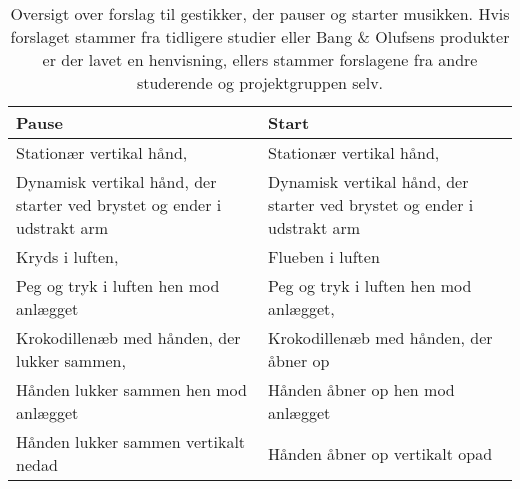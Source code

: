 \begin{table}[H]
	\centering
	\begin{tabular}{| p{6cm} | p{6cm} | }
		\hline
		\textbf{Pause} & \textbf{Start} \\ \hline
		Stationær vertikal hånd, \parencite[s. 166]{PDF:ComparingInputModalities} & Stationær vertikal hånd, \parencite[s. 166]{PDF:ComparingInputModalities} \\ \hline
		Dynamisk vertikal hånd, der starter ved brystet og ender i udstrakt arm  & Dynamisk vertikal hånd, der starter ved brystet og ender i udstrakt arm  \\ \hline
		Kryds i luften, \parencite[s. 48]{PDF:UserDefinedGesturesTV} & Flueben i luften \\ \hline
		Peg og tryk i luften hen mod anlægget & Peg og tryk i luften hen mod anlægget, \parencite[s. 48]{PDF:UserDefinedGesturesTV} \\ \hline
		Krokodillenæb med hånden, der lukker sammen, \parencite[s. 48]{PDF:UserDefinedGesturesTV} & Krokodillenæb med hånden, der åbner op \\ \hline
		Hånden lukker sammen hen mod anlægget & Hånden åbner op hen mod anlægget \\ \hline
		Hånden lukker sammen vertikalt nedad & Hånden åbner op vertikalt opad  \\ \hline
	\end{tabular}
	\caption{Oversigt over forslag til gestikker, der pauser og starter musikken. Hvis forslaget stammer fra tidligere studier eller Bang $\&$ Olufsens produkter er der lavet en henvisning, ellers stammer forslagene fra andre studerende og projektgruppen selv.}
	\label{tab:IndsamledeGestikkerPause}
\end{table}
\noindent

